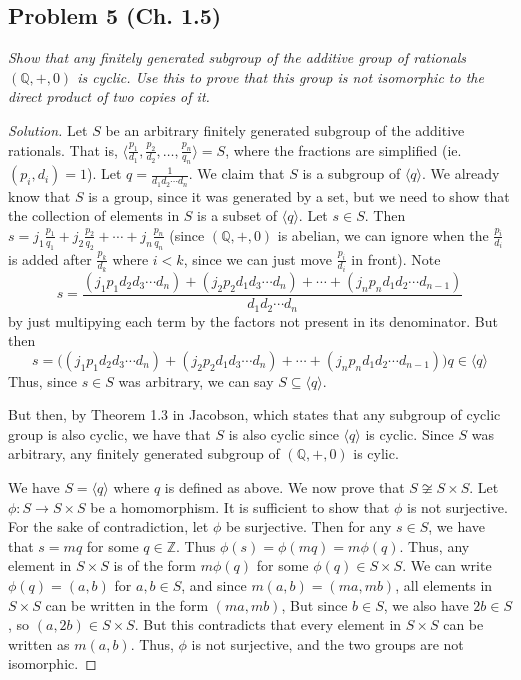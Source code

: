 \documentclass{article}
\newcommand{\Z}{{\mathbb Z}}
\newcommand{\Q}{{\mathbb Q}}
\begin{document}
\subsection*{Problem 5 (Ch. 1.5)}
{\it Show that any finitely generated subgroup of the additive group
of rationals $(\Q,+,0)$ is cyclic.
Use this to prove that this group is not isomorphic to
the direct product of two copies of it.}
\begin{proof}[Solution]\let\qed\relax
	Let $S$ be an arbitrary finitely generated subgroup of the additive rationals.
	That is, $\langle \frac{p_1}{d_1},\frac{p_2}{d_2},\dots,\frac{p_n}{q_n}\rangle = S$, where the fractions are simplified (ie. $(p_i,d_i) = 1$).
	Let $q = \frac{1}{d_1d_2\cdots d_n}$.
	We claim that $S$ is a subgroup of $\langle q \rangle$.
	We already know that $S$ is a group, since it was generated by a set,
	but we need to show that the collection of elements in $S$ is a subset of $\langle q \rangle$.
	Let $s \in S$.
	Then $s = j_1\frac{p_1}{q_1} + j_2\frac{p_2}{q_2} + \cdots + j_n\frac{p_n}{q_n}$
	(since $(\Q,+,0)$ is abelian, we can ignore when the $\frac{p_i}{d_i}$
	is added after $\frac{p_k}{d_k}$ where $i<k$,
	since we can just move $\frac{p_i}{d_i}$ in front).
	Note
	\[
		s = \frac{(j_1 p_1 d_2d_3\cdots d_n) + (j_2 p_2 d_1d_3\cdots d_n)
		+ \cdots + (j_np_n d_1d_2 \cdots d_{n-1})}{d_1d_2 \cdots d_n}
	\]
	by just multipying each term by the factors not present in
	its denominator.
	But then
	\[
		s = \big((j_1 p_1 d_2d_3\cdots d_n) + (j_2 p_2 d_1d_3\cdots d_n)
	+ \cdots + (j_np_n d_1d_2 \cdots d_{n-1})\big)q \in \langle q \rangle
	\]
	Thus, since $s \in S$ was arbitrary, we can say $S \subseteq \langle q \rangle$.

	But then, by Theorem 1.3 in Jacobson,
	which states that any subgroup of cyclic group is also cyclic,
	we have that $S$ is also cyclic since $\langle q \rangle$ is cyclic.
	Since $S$ was arbitrary, any finitely generated subgroup of $(\Q,+,0)$ is cylic.
	
	We have $S = \langle q \rangle$ where $q$ is defined as above.
	We now prove that $S \not\cong S \times S$.
	Let $\phi \colon S \to S \times S$ be a homomorphism.
	It is sufficient to show that $\phi$ is not surjective.
	For the sake of contradiction, let $\phi$ be surjective.
	Then for any $s \in S$,
	we have that $s = mq$ for some $q \in \Z$.
	Thus $\phi(s) = \phi(mq) = m\phi(q)$.
	Thus, any element in $S \times S$ is of the form $m\phi(q)$ for some $\phi(q) \in S \times S$.
	We can write $\phi(q) = (a,b)$ for $a,b \in S$,
	and since $m(a,b) = (ma,mb)$, all elements in $S \times S$
	can be written in the form $(ma,mb)$,
	But since $b \in S$, we also have $2b \in S$,
	so $(a,2b) \in S \times S$.
	But this contradicts that every element in $S \times S$ can be written as $m(a,b)$.
	Thus, $\phi$ is not surjective,
	and the two groups are not isomorphic.
\end{proof}
\end{document}
